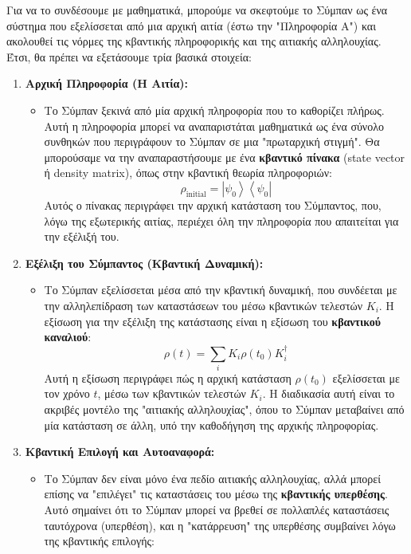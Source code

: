 \documentclass[a4paper,11pt]{article}
\begin{document}
Για να το συνδέσουμε με μαθηματικά, μπορούμε να σκεφτούμε το Σύμπαν ως
ένα σύστημα που εξελίσσεται από μια αρχική αιτία (έστω την "Πληροφορία
Α") και ακολουθεί τις νόρμες της κβαντικής πληροφορικής και της αιτιακής
αλληλουχίας. Έτσι, θα πρέπει να εξετάσουμε τρία βασικά στοιχεία:

\begin{enumerate}
\item
  \textbf{Αρχική Πληροφορία (Η Αιτία):}

  \begin{itemize}
  \item
    Το Σύμπαν ξεκινά από μία αρχική πληροφορία που το καθορίζει πλήρως.
    Αυτή η πληροφορία μπορεί να αναπαριστάται μαθηματικά ως ένα σύνολο
    συνθηκών που περιγράφουν το Σύμπαν σε μια "πρωταρχική στιγμή". Θα
    μπορούσαμε να την αναπαραστήσουμε με ένα \textbf{κβαντικό πίνακα}
    (state vector ή density matrix), όπως στην κβαντική θεωρία
    πληροφοριών:
\[
\rho_{\text{initial}} = \left| \psi_0 \right\rangle \left\langle \psi_0 \right|
\]
    Αυτός ο πίνακας περιγράφει την αρχική κατάσταση του Σύμπαντος, που,
    λόγω της εξωτερικής αιτίας, περιέχει όλη την πληροφορία που
    απαιτείται για την εξέλιξή του.
  \end{itemize}
\item
  \textbf{Εξέλιξη του Σύμπαντος (Κβαντική Δυναμική):}

  \begin{itemize}
  \item
    Το Σύμπαν εξελίσσεται μέσα από την κβαντική δυναμική, που συνδέεται
    με την αλληλεπίδραση των καταστάσεων του μέσω κβαντικών τελεστών
    {{\(K_i\)}}. Η εξίσωση για την εξέλιξη της κατάστασης είναι η
    εξίσωση του \textbf{κβαντικού καναλιού}:
    {{{\[\rho(t) = \sum_i K_i \rho(t_0) K_i^\dagger\]}}} Αυτή η εξίσωση
    περιγράφει πώς η αρχική κατάσταση {{\(\rho(t_0)\)}} εξελίσσεται με
    τον χρόνο {{\(t\)}}, μέσω των κβαντικών τελεστών {{\(K_i\)}}. Η
    διαδικασία αυτή είναι το ακριβές μοντέλο της "αιτιακής αλληλουχίας",
    όπου το Σύμπαν μεταβαίνει από μία κατάσταση σε άλλη, υπό την
    καθοδήγηση της αρχικής πληροφορίας.
  \end{itemize}
\item
  \textbf{Κβαντική Επιλογή και Αυτοαναφορά:}

  \begin{itemize}
  \item
    Το Σύμπαν δεν είναι μόνο ένα πεδίο αιτιακής αλληλουχίας, αλλά μπορεί
    επίσης να "επιλέγει" τις καταστάσεις του μέσω της \textbf{κβαντικής
    υπερθέσης}. Αυτό σημαίνει ότι το Σύμπαν μπορεί να βρεθεί σε
    πολλαπλές καταστάσεις ταυτόχρονα (υπερθέση), και η "κατάρρευση" της
    υπερθέσης συμβαίνει λόγω της κβαντικής επιλογής:


\end{itemize}
\end{enumerate}
\end{document}
